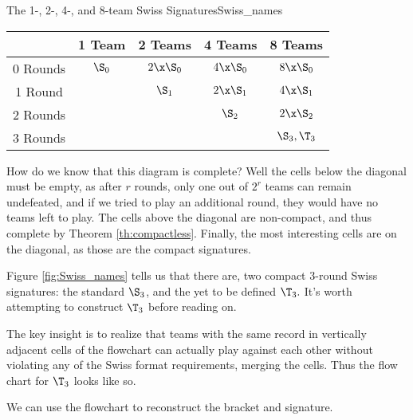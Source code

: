 {    \begin{figg}{The 1-, 2-, 4-, and 8-team Swiss Signatures}{Swiss_names}
        \begin{center}
            \begin{tabular}{ c | c | c | c | c}
                & 1 Team & 2 Teams & 4 Teams & 8 Teams\\
                \hline
                0 Rounds & $\S_0$ & $2\x\S_0$ & $4\x\S_0$ & $8\x\S_0$\\
                \hline
                1 Round & & $\S_1$ & $2\x\S_1$ & $4\x\S_1$\\
                \hline
                2 Rounds & & & $\S_2$ & $2\x\S_2$\\
                \hline
                \multirow{1}{*}{3 Rounds} & & & &  $\S_3, \T_3$ \\
            \end{tabular}
        \end{center}
        \end{figg}

    How do we know that this diagram is complete? Well the cells below the diagonal must be empty, as after $r$ rounds, only one out of $2^r$ teams can remain undefeated, and if we tried to play an additional round, they would have no teams left to play. The cells above the diagonal are non-compact, and thus complete by Theorem \ref{th:compactless}. Finally, the most interesting cells are on the diagonal, as those are the compact signatures.


    Figure \ref{fig:Swiss_names} tells us that there are, two compact 3-round Swiss signatures: the standard $\S_3$, and the yet to be defined $\T_3.$ It's worth attempting to construct $\T_3$ before reading on.

    The key insight is to realize that teams with the same record in vertically adjacent cells of the flowchart can actually play against each other without violating any of the Swiss format requirements, merging the cells. Thus the flow chart for $\T_3$ looks like so.


    We can use the flowchart to reconstruct the bracket and signature.


}
